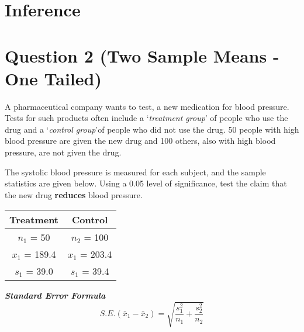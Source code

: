 \documentclass[a4paper,12pt]{article}
\begin{document}
\section{Inference}


\section*{Question 2 (Two Sample Means - One Tailed)}
A pharmaceutical company wants to test, a new medication for blood pressure. Tests
for such products often include a `\textit{treatment group}' of people who use the drug and a `\textit{control group}'of people who did not use the drug. 50 people with high blood pressure are given the new drug and 100 others, also with high blood pressure, are not given the drug. 

The systolic blood pressure is measured for each subject, and the sample statistics
are given below. Using a 0.05 level of significance, test the claim that the new drug \textbf{reduces}
blood pressure. 
\begin{center}
\begin{tabular}{|c||c|}
\hline 
Treatment & Control \\ \hline \hline
$n_1$ = 50 & $n_2$ = 100 \\ \hline
$x_1$ = 189.4  & $x_1$ = 203.4  \\ \hline
$s_1$ = 39.0 & $s_1$ = 39.4 \\ \hline
\end{tabular} 
\end{center}
\textbf{\textit{Standard Error Formula}}
\[ S.E.(\bar{x}_1 - \bar{x}_2)  = \sqrt{\frac{s_1^2}{n_1} + \frac{s_2^2}{n_2}} \]
\end{document}
